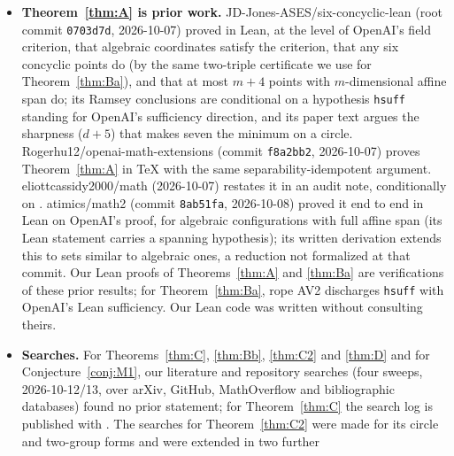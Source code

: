 \documentclass[11pt]{amsart}
\theoremstyle{plain}
\theoremstyle{definition}
\begin{document}
\begin{itemize}
Three further appendix theorems were not cited in version~1.0.0: Theorem~A.11, that a fixed weighted
derivation-energy identity with all weights nonzero needs more than $2d+2$ points of an affinely
$d$-dimensional spherical set (so none exists on at most six points); Theorem~A.12, that for $d\ge3$ a set
of $(d+1)(d+2)/2$ points on $S^{d-1}$ whose stereographic parameters are algebraically independent is
not Ramsey, which is the non-Ramsey half of Conjecture~\ref{conj:C3} for $d\ge3$ and contains the
ten-point cell of Theorem~\ref{thm:NR}; and Theorem~A.13, explicit non-Ramsey spherical sets of $2d+3$
points in every affine dimension $d\ge2$.
\item \textbf{Theorem~\ref{thm:A} is prior work.} JD-Jones-ASES/six-concyclic-lean \cite{JDJones}
(root commit \texttt{0703d7d}, 2026-10-07) proved in Lean, at the level of OpenAI's field
criterion, that algebraic coordinates satisfy the criterion, that any six concyclic points do (by the
same two-triple certificate we use for Theorem~\ref{thm:Ba}), and that at most $m+4$ points with
$m$-dimensional affine span do; its Ramsey conclusions are conditional on a hypothesis
\texttt{hsuff} standing for OpenAI's sufficiency direction, and its paper text argues the sharpness
($d+5$) that makes seven the minimum on a circle. Rogerhu12/openai-math-extensions \cite{Rogerhu}
(commit \texttt{f8a2bb2}, 2026-10-07) proves Theorem~\ref{thm:A} in \TeX{} with the same
separability-idempotent argument. eliottcassidy2000/math \cite{Eliott} (2026-10-07) restates it in
an audit note, conditionally on \cite{OAI172}. atimics/math2 \cite{Atimics} (commit \texttt{8ab51fa},
2026-10-08) proved it end to end in Lean on OpenAI's proof, for algebraic configurations with full
affine span (its Lean statement carries a spanning hypothesis); its written derivation extends this
to sets similar to algebraic ones, a reduction not formalized at that commit. Our Lean proofs of
Theorems~\ref{thm:A} and \ref{thm:Ba} are verifications of these prior results; for
Theorem~\ref{thm:Ba}, rope AV2 discharges \texttt{hsuff} with OpenAI's Lean sufficiency. Our Lean code was
written without consulting theirs.
\item \textbf{Searches.} For Theorems~\ref{thm:C}, \ref{thm:Bb}, \ref{thm:C2} and \ref{thm:D} and
for Conjecture~\ref{conj:M1}, our literature and repository searches (four sweeps, 2026-10-12/13,
over arXiv, GitHub, MathOverflow and bibliographic databases) found no prior statement; for
Theorem~\ref{thm:C} the search log is published with \cite{MR}. The searches for
Theorem~\ref{thm:C2} were made for its circle and two-group forms and were extended in two further

\end{itemize}
\end{document}
